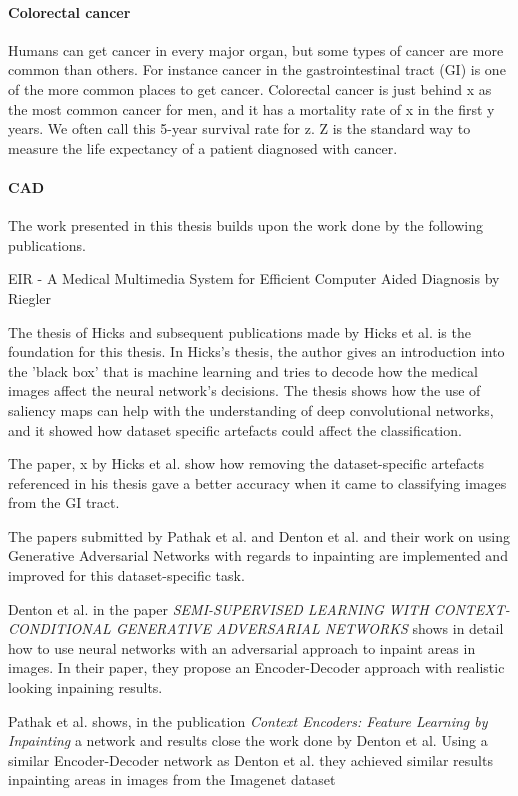 \paragraph{Colorectal cancer}
Humans can get cancer in every major organ, but some types of cancer are more common than others.    
For instance cancer in the gastrointestinal tract (GI) is one of the more common places to get cancer. Colorectal cancer is just behind x as the most common cancer for men, and it has a mortality rate of x in the first y years. %
We often call this 5-year survival rate for z. Z is the standard way to measure the life expectancy of a patient diagnosed with cancer. 

\paragraph{CAD}

The work presented in this thesis builds upon the work done by the following publications.


EIR - A Medical Multimedia System for Efficient
Computer Aided Diagnosis by Riegler 

The thesis of Hicks and subsequent publications made by Hicks et al. is the foundation for this thesis. In Hicks's thesis, the author gives an introduction into the 'black box' that is machine learning and tries to decode how the medical images affect the neural network's decisions. 
The thesis shows how the use of saliency maps can help with the understanding of deep convolutional networks, and it showed how dataset specific artefacts could affect the classification.


The paper, x by Hicks et al. show how removing the dataset-specific artefacts referenced in his thesis gave a better accuracy when it came to classifying images from the GI tract.


The papers submitted by Pathak et al. and Denton et al. and their work on using Generative Adversarial Networks with regards to inpainting are implemented and improved for this dataset-specific task.

Denton et al. in the paper \textit{SEMI-SUPERVISED LEARNING WITH
CONTEXT-CONDITIONAL GENERATIVE
ADVERSARIAL NETWORKS} shows in detail how to use neural networks with an adversarial approach to inpaint areas in images. In their paper, they propose an Encoder-Decoder approach with realistic looking inpaining results.


Pathak et al. shows, in the publication \textit{Context Encoders: Feature Learning by Inpainting} a network and results close the work done by Denton et al. Using a similar Encoder-Decoder network as Denton et al. they achieved similar results inpainting areas in images from the Imagenet dataset

